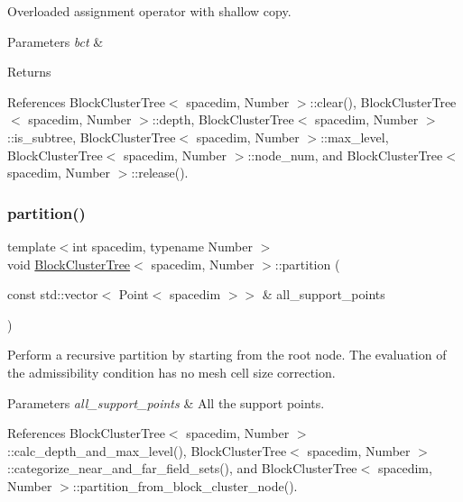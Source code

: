 Overloaded assignment operator with shallow copy. 
\begin{DoxyParams}{Parameters}
{\em bct} & \\
\hline
\end{DoxyParams}
\begin{DoxyReturn}{Returns}

\end{DoxyReturn}


References Block\+Cluster\+Tree$<$ spacedim, Number $>$\+::clear(), Block\+Cluster\+Tree$<$ spacedim, Number $>$\+::depth, Block\+Cluster\+Tree$<$ spacedim, Number $>$\+::is\+\_\+subtree, Block\+Cluster\+Tree$<$ spacedim, Number $>$\+::max\+\_\+level, Block\+Cluster\+Tree$<$ spacedim, Number $>$\+::node\+\_\+num, and Block\+Cluster\+Tree$<$ spacedim, Number $>$\+::release().

\mbox{\label{classBlockClusterTree_a3ca42421f732c20fc07bdf5d5ab94319}} 
\subsubsection{\texorpdfstring{partition()}{partition()}\hspace{0.1cm}{\footnotesize\ttfamily [1/2]}}
{\footnotesize\ttfamily template$<$int spacedim, typename Number $>$ \\
void \hyperlink{classBlockClusterTree}{Block\+Cluster\+Tree}$<$ spacedim, Number $>$\+::partition (\begin{DoxyParamCaption}\item[{const std\+::vector$<$ Point$<$ spacedim $>$$>$ \&}]{all\+\_\+support\+\_\+points }\end{DoxyParamCaption})}

Perform a recursive partition by starting from the root node. The evaluation of the admissibility condition has no mesh cell size correction.


\begin{DoxyParams}{Parameters}
{\em all\+\_\+support\+\_\+points} & All the support points. \\
\hline
\end{DoxyParams}


References Block\+Cluster\+Tree$<$ spacedim, Number $>$\+::calc\+\_\+depth\+\_\+and\+\_\+max\+\_\+level(), Block\+Cluster\+Tree$<$ spacedim, Number $>$\+::categorize\+\_\+near\+\_\+and\+\_\+far\+\_\+field\+\_\+sets(), and Block\+Cluster\+Tree$<$ spacedim, Number $>$\+::partition\+\_\+from\+\_\+block\+\_\+cluster\+\_\+node().



